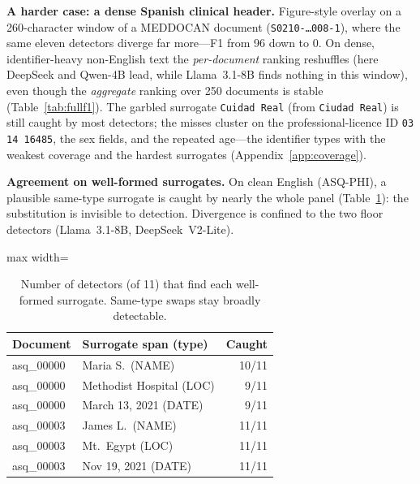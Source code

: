 \documentclass[pmlr,twocolumn,10pt]{jmlr}
\newcommand{\tp}[1]{\texttt{#1}}
\begin{document}
{\footnotesize
\setlength{\fboxsep}{1pt}%
\newcommand{\panel}[3]{\par\vspace{2.5pt}\noindent\fcolorbox{cline}{white}{\parbox{0.965\linewidth}{%
\textbf{#1}\hfill{\scriptsize\color{cmuted}#2}\\[2pt]\ttfamily\scriptsize #3}}}

\par}
\vspace{4pt}

\textbf{A harder case: a dense Spanish clinical header.} Figure-style overlay on a 260-character window of a MEDDOCAN document (\tp{S0210-\dots008-1}), where the same eleven detectors diverge far more---F1 from 96 down to 0. On dense, identifier-heavy non-English text the \emph{per-document} ranking reshuffles (here DeepSeek and Qwen-4B lead, while Llama~3.1-8B finds nothing in this window), even though the \emph{aggregate} ranking over 250 documents is stable (Table~\ref{tab:fullf1}). The garbled surrogate \tp{Cuidad Real} (from \tp{Ciudad Real}) is still caught by most detectors; the misses cluster on the professional-licence ID \tp{03 14 16485}, the sex fields, and the repeated age---the identifier types with the weakest coverage and the hardest surrogates (Appendix~\ref{app:coverage}).

{\footnotesize
\setlength{\fboxsep}{1pt}%
\newcommand{\panel}[3]{\par\vspace{2.5pt}\noindent\fcolorbox{cline}{white}{\parbox{0.965\linewidth}{%
\textbf{#1}\hfill{\scriptsize\color{cmuted}#2}\\[2pt]\ttfamily\scriptsize #3}}}

\par}
\vspace{4pt}

\textbf{Agreement on well-formed surrogates.} On clean English (ASQ-PHI), a plausible same-type surrogate is caught by nearly the whole panel (Table~\ref{tab:agree}): the substitution is invisible to detection. Divergence is confined to the two floor detectors (Llama~3.1-8B, DeepSeek~V2-Lite).

\begin{table}[h]\centering\small
\begin{adjustbox}{max width=\columnwidth}%
\begin{tabular}{llr}
\toprule
Document & Surrogate span (type) & Caught\\
\midrule
asq\_00000 & Maria S.\ (NAME) & 10/11\\
asq\_00000 & Methodist Hospital (LOC) & 9/11\\
asq\_00000 & March 13, 2021 (DATE) & 9/11\\
asq\_00003 & James L.\ (NAME) & 11/11\\
asq\_00003 & Mt.\ Egypt (LOC) & 11/11\\
asq\_00003 & Nov 19, 2021 (DATE) & 11/11\\
\bottomrule
\end{tabular}
\end{adjustbox}
\caption{Number of detectors (of 11) that find each well-formed surrogate. Same-type swaps stay broadly detectable.}\label{tab:agree}
\end{table}
\end{document}
